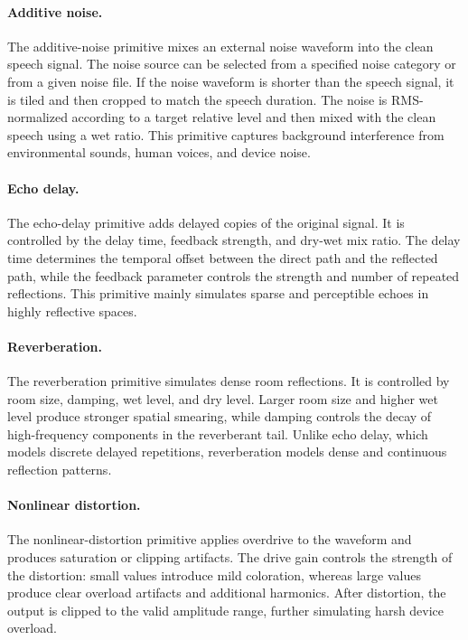 \documentclass{article}
\begin{document}
\paragraph{Additive noise.}
The additive-noise primitive mixes an external noise waveform into the clean
speech signal. The noise source can be selected from a specified noise category
or from a given noise file. If the noise waveform is shorter than the speech
signal, it is tiled and then cropped to match the speech duration. The noise is
RMS-normalized according to a target relative level and then mixed with the
clean speech using a wet ratio. This primitive captures background interference
from environmental sounds, human voices, and device noise.

\paragraph{Echo delay.}
The echo-delay primitive adds delayed copies of the original signal. It is
controlled by the delay time, feedback strength, and dry-wet mix ratio. The
delay time determines the temporal offset between the direct path and the
reflected path, while the feedback parameter controls the strength and number
of repeated reflections. This primitive mainly simulates sparse and perceptible
echoes in highly reflective spaces.

\paragraph{Reverberation.}
The reverberation primitive simulates dense room reflections. It is controlled
by room size, damping, wet level, and dry level. Larger room size and higher wet
level produce stronger spatial smearing, while damping controls the decay of
high-frequency components in the reverberant tail. Unlike echo delay, which
models discrete delayed repetitions, reverberation models dense and continuous
reflection patterns.

\paragraph{Nonlinear distortion.}
The nonlinear-distortion primitive applies overdrive to the waveform and
produces saturation or clipping artifacts. The drive gain controls the strength
of the distortion: small values introduce mild coloration, whereas large values
produce clear overload artifacts and additional harmonics. After distortion, the
output is clipped to the valid amplitude range, further simulating harsh device
overload.
\end{document}
